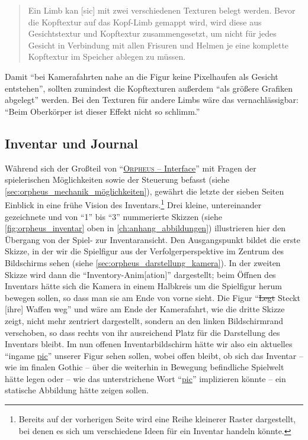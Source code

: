 \documentclass[a5paper,pagesize,numbers=noenddot]{scrbook}
\begin{document}
\begin{quote}
   Ein Limb kan [sic] mit zwei verschiedenen Texturen belegt werden.
   Bevor die Kopftextur auf das Kopf-Limb gemappt wird, wird diese aus Gesichtstextur und Kopftextur zusammengesetzt, um nicht für jedes Gesicht in Verbindung mit allen Frisuren und Helmen je eine komplette Kopftextur im Speicher ablegen zu müssen.\autocite[S.~2\,f.]{orpheus_zusammenfassung_1996}
\end{quote}

Damit \enquote{bei Kamerafahrten nahe an die Figur keine Pixelhaufen als Gesicht entstehen}, sollten zumindest die Kopftexturen außerdem \enquote{als größere Grafiken abgelegt} werden.
Bei den Texturen für andere Limbs wäre das vernachlässigbar: \enquote{Beim Oberkörper ist dieser Effekt nicht so schlimm.}\autocite[S.~2]{orpheus_zusammenfassung_1996}


\subsection{Inventar und Journal}\label{sec:orpheus_darstellung_inventar}
Während sich der Großteil von \enquote{\uline{\textsc{Orpheus} -- Interface}} mit Fragen der spielerischen Möglichkeiten sowie der Steuerung befasst (siehe \autoref{sec:orpheus_mechanik_möglichkeiten}), gewährt die letzte der sieben Seiten Einblick in eine frühe Vision des Inventars.\footnote{Bereits auf der vorherigen Seite wird eine Reihe kleinerer Raster dargestellt, bei denen es sich um verschiedene Ideen für ein Inventar handeln könnte.}
Drei kleine, untereinander gezeichnete und von \enquote{1} bis \enquote{3} nummerierte Skizzen (siehe \autoref{fig:orpheus_inventar} oben in \autoref{ch:anhang_abbildungen}) illustrieren hier den Übergang von der Spiel- zur Inventar\-ansicht.
Den Ausgangspunkt bildet die erste Skizze, in der wir die Spielfigur aus der Verfolgerperspektive im Zentrum des Bildschirms sehen (siehe \autoref{sec:orpheus_darstellung_kamera}).
In der zweiten Skizze wird dann die \enquote{Inventory-Anim[ation]} dargestellt; beim Öffnen des Inventars hätte sich die Kamera in einem Halbkreis um die Spielfigur herum bewegen sollen, so dass man sie am Ende von vorne sieht.
Die Figur \enquote{\sout{Legt} Steckt [ihre] Waffen weg} und wäre am Ende der Kamerafahrt, wie die dritte Skizze zeigt, nicht mehr zentriert dargestellt, sondern an den linken Bildschirmrand verschoben, so dass rechts von ihr ausreichend Platz für die Darstellung des Inventars bleibt.
Im nun offenen Inventarbildschirm hätte wir also ein aktuelles \enquote{ingame \uline{pic}} unserer Figur sehen sollen, wobei offen bleibt, ob sich das Inventar -- wie im finalen Gothic -- über die weiterhin in Bewegung befindliche Spielwelt hätte legen oder -- wie das unterstrichene Wort \enquote{\uline{pic}} implizieren könnte -- ein statische Abbildung hätte zeigen sollen.\autocite[S.~7]{orpheus_interface}
\end{document}
